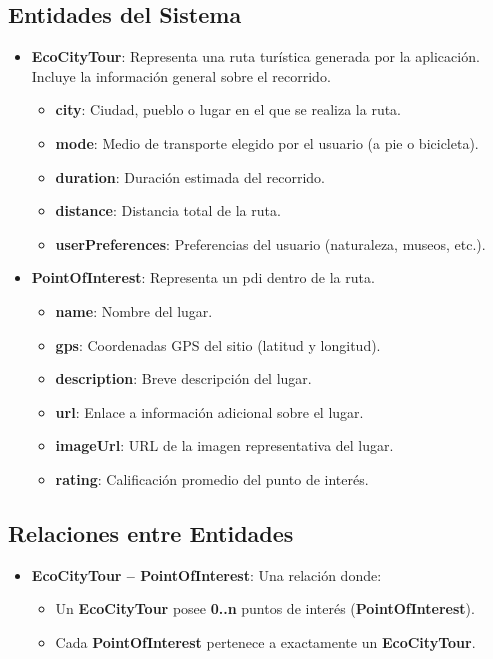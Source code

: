 \subsection{Entidades del Sistema}
\begin{itemize}
	\item \textbf{EcoCityTour}: Representa una ruta turística generada por la aplicación. Incluye la información general sobre el recorrido.
	\begin{itemize}
		\item \textbf{city}: Ciudad, pueblo o lugar en el que se realiza la ruta.
		\item \textbf{mode}: Medio de transporte elegido por el usuario (a pie o bicicleta).
		\item \textbf{duration}: Duración estimada del recorrido.
		\item \textbf{distance}: Distancia total de la ruta.
		\item \textbf{userPreferences}: Preferencias del usuario (naturaleza, museos, etc.).
	\end{itemize}
	
	\item {\textbf{PointOfInterest}}: Representa un \acrlong{pdi} dentro de la ruta.
	\begin{itemize}
		\item \textbf{name}: Nombre del lugar.
		\item \textbf{gps}: Coordenadas GPS del sitio (latitud y longitud).
		\item \textbf{description}: Breve descripción del lugar.
		\item \textbf{url}: Enlace a información adicional sobre el lugar.
		\item \textbf{imageUrl}: URL de la imagen representativa del lugar.
		\item \textbf{rating}: Calificación promedio del punto de interés.
	\end{itemize}
\end{itemize}

\subsection{Relaciones entre Entidades}
\begin{itemize}
	\item \textbf{EcoCityTour -- PointOfInterest}: Una relación  donde:
	\begin{itemize}
		\item Un \textbf{EcoCityTour} posee \textbf{0..n} puntos de interés (\textbf{PointOfInterest}).
		\item Cada \textbf{PointOfInterest} pertenece a exactamente un \textbf{EcoCityTour}.
	\end{itemize}
\end{itemize}


